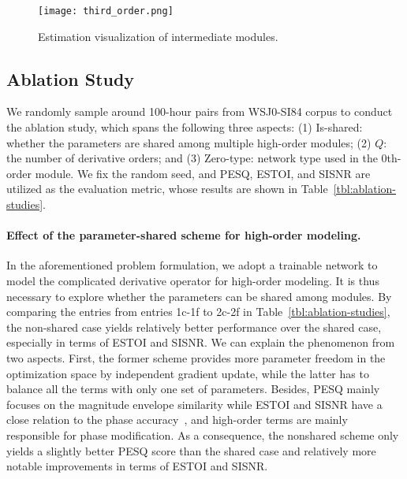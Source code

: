 \documentclass{article}
\begin{document}
{\begin{figure}
{\begin{minipage}[b]{0.232\linewidth}
			\texttt{[image: third\_order.png]}\vspace{-2pt}
			\vspace{-4pt}
	\end{minipage}}
	\caption{Estimation visualization of intermediate modules.}
	\vspace{-0.4cm}
	\label{fig:visualization}
\end{figure}
\vspace{-0.2cm}
\subsection{Ablation Study}
\label{sec:ablation-study}
We randomly sample around 100-hour pairs from WSJ0-SI84 corpus to conduct the ablation study, which spans the following three aspects: (1) Is-shared: whether the parameters are shared among multiple high-order modules; (2) $Q$: the number of derivative orders; and (3) Zero-type: network type used in the 0th-order module. We fix the random seed, and PESQ, ESTOI, and SISNR are utilized as the evaluation metric, whose results are shown in Table~{\ref{tbl:ablation-studies}}.
\paragraph{Effect of the parameter-shared scheme for high-order modeling.} In the aforementioned problem formulation, we adopt a trainable network to model the complicated derivative operator for high-order modeling. It is thus necessary to explore whether the parameters can be shared among modules. By comparing the entries from entries 1c-1f to 2c-2f in Table~{\ref{tbl:ablation-studies}}, the non-shared case yields relatively better performance over the shared case, especially in terms of ESTOI and SISNR. We can explain the phenomenon from two aspects. First, the former scheme provides more parameter freedom in the optimization space by independent gradient update, while the latter has to balance all the terms with only one set of parameters. Besides, PESQ mainly focuses on the magnitude envelope similarity while ESTOI and SISNR have a close relation to the phase accuracy~{\cite{wang2021compensation}}, and high-order terms are mainly responsible for phase modification. As a consequence, the nonshared scheme only yields a slightly better PESQ score than the shared case and relatively more notable improvements in terms of ESTOI and SISNR.
}
\end{document}
